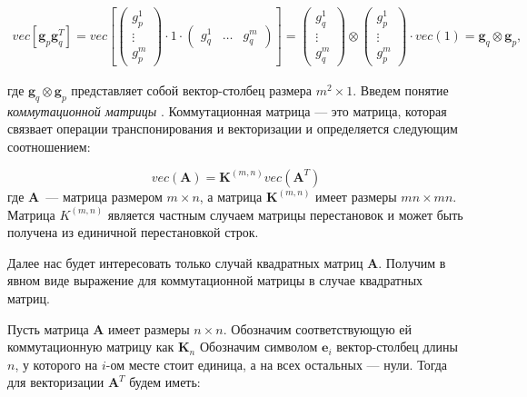 \begin{gather}
    vec[\mathbf{g}_p \mathbf{g}_q^T] = vec\left[
        \begin{pmatrix}
            g_p^1 \\
            \vdots \\
            g_p^m
        \end{pmatrix}
    \cdot 1 \cdot
    \begin{pmatrix}
        g_q^1 & \dots & g_q^m
    \end{pmatrix}
    \right] = %
    \begin{pmatrix}
        g_q^1 \\
        \vdots \\
        g_q^m
    \end{pmatrix}
    \otimes
    \begin{pmatrix}
        g_p^1 \\
        \vdots \\
        g_p^m
    \end{pmatrix}
    \cdot
    vec(1) =
    \mathbf{g}_q \otimes \mathbf{g}_p,
\end{gather}


где $\mathbf{g}_q \otimes \mathbf{g}_p$ представляет собой вектор-столбец размера $m^2 \times 1$.
Введем понятие \emph{коммутационной матрицы} \cite{neudecker}.
Коммутационная матрица --- это матрица, которая связвает операции транспонирования и векторизации
и определяется следующим соотношением:

\begin{equation}
    vec(\mathbf{A}) = \mathbf{K}^{(m,n)} vec(\mathbf{A}^T)
    \label{eq:commutation_matrix_def}
\end{equation}
где $\mathbf{A}$~--- матрица размером $m \times n$, а матрица $\mathbf{K}^{(m,n)}$ имеет размеры
$mn \times mn$.
Матрица $K^{(m,n)}$ является частным случаем матрицы перестановок и
может быть получена из единичной перестановкой строк.

Далее нас будет интересовать только случай квадратных матриц $\mathbf{A}$.
Получим в явном виде выражение для коммутационной матрицы в случае квадратных матриц.

Пусть матрица $\mathbf{A}$ имеет размеры $n \times n$. Обозначим соответствующую ей коммутационную матрицу
как $\mathbf{K}_n$
Обозначим символом $\mathbf{e}_i$ вектор-столбец длины $n$, у которого на $i$-ом месте стоит
единица, а на всех остальных --- нули. Тогда для векторизации $\mathbf{A}^T$ будем иметь:

